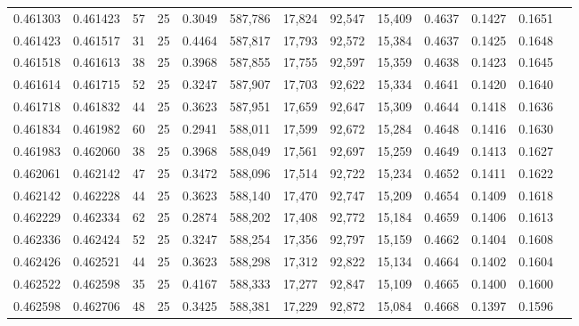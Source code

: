 \begin{tabular}{rrrrrrrrrrrrr}
0.461303 & 0.461423 &    57 &  25 &                                     0.3049 & 587,786 &  17,824 &  92,547 &  15,409 & 0.4637 & 0.1427 & 0.1651 \\
0.461423 & 0.461517 &    31 &  25 &                                     0.4464 & 587,817 &  17,793 &  92,572 &  15,384 & 0.4637 & 0.1425 & 0.1648 \\
0.461518 & 0.461613 &    38 &  25 &                                     0.3968 & 587,855 &  17,755 &  92,597 &  15,359 & 0.4638 & 0.1423 & 0.1645 \\
0.461614 & 0.461715 &    52 &  25 &                                     0.3247 & 587,907 &  17,703 &  92,622 &  15,334 & 0.4641 & 0.1420 & 0.1640 \\
0.461718 & 0.461832 &    44 &  25 &                                     0.3623 & 587,951 &  17,659 &  92,647 &  15,309 & 0.4644 & 0.1418 & 0.1636 \\
0.461834 & 0.461982 &    60 &  25 &                                     0.2941 & 588,011 &  17,599 &  92,672 &  15,284 & 0.4648 & 0.1416 & 0.1630 \\
0.461983 & 0.462060 &    38 &  25 &                                     0.3968 & 588,049 &  17,561 &  92,697 &  15,259 & 0.4649 & 0.1413 & 0.1627 \\
0.462061 & 0.462142 &    47 &  25 &                                     0.3472 & 588,096 &  17,514 &  92,722 &  15,234 & 0.4652 & 0.1411 & 0.1622 \\
0.462142 & 0.462228 &    44 &  25 &                                     0.3623 & 588,140 &  17,470 &  92,747 &  15,209 & 0.4654 & 0.1409 & 0.1618 \\
0.462229 & 0.462334 &    62 &  25 &                                     0.2874 & 588,202 &  17,408 &  92,772 &  15,184 & 0.4659 & 0.1406 & 0.1613 \\
0.462336 & 0.462424 &    52 &  25 &                                     0.3247 & 588,254 &  17,356 &  92,797 &  15,159 & 0.4662 & 0.1404 & 0.1608 \\
0.462426 & 0.462521 &    44 &  25 &                                     0.3623 & 588,298 &  17,312 &  92,822 &  15,134 & 0.4664 & 0.1402 & 0.1604 \\
0.462522 & 0.462598 &    35 &  25 &                                     0.4167 & 588,333 &  17,277 &  92,847 &  15,109 & 0.4665 & 0.1400 & 0.1600 \\
0.462598 & 0.462706 &    48 &  25 &                                     0.3425 & 588,381 &  17,229 &  92,872 &  15,084 & 0.4668 & 0.1397 & 0.1596 \\

\end{tabular}
